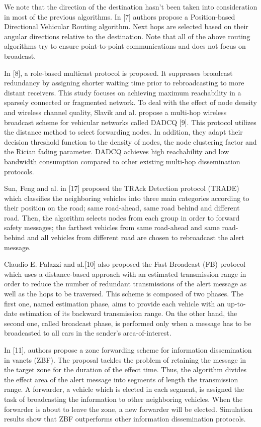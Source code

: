 \documentclass{IEEEtran}
\begin{document}
We note that the direction of the destination hasn't been taken into
consideration in most of the previous algorithms. In [7] authors
propose a Position-based Directional Vehicular Routing algorithm.
Next hops are selected based on their angular directions relative to
the destination. Note that all of the above routing algorithms try
to ensure point-to-point communications and does not focus on
broadcast.

In [8], a role-based multicast protocol is proposed. It suppresses
broadcast redundancy by assigning shorter waiting time prior to
rebroadcasting to more distant receivers. This study focuses on
achieving maximum reachability in a sparsely connected or fragmented
network. To deal with the effect of node density and wireless
channel quality, Slavik and al. propose  a multi-hop wireless
broadcast scheme for vehicular networks called DADCQ [9]. This
protocol utilizes the distance method to select forwarding nodes. In
addition, they adapt their decision threshold function to the
density of nodes, the node clustering factor and the Rician fading
parameter. DADCQ achieves high reachability and low bandwidth
consumption compared to other existing multi-hop dissemination
protocols.

Sun, Feng and al. in [17] proposed the TRAck Detection protocol
(TRADE) which classifies the neighboring vehicles into three main
categories according to their position on the road; same road-ahead,
same road behind and different road. Then, the algorithm selects
nodes from each group in order to forward safety messages; the
farthest vehicles from same road-ahead and same road-behind and all
vehicles from different road are chosen to rebroadcast the alert
message.

Claudio E. Palazzi and al.[10] also proposed the Fast Broadcast (FB)
protocol which uses a distance-based approach with an estimated
transmission range in order to reduce the number of redundant
transmissions of the alert message as well as the hops to be
traversed. This scheme is composed of two phases. The first one,
named estimation phase, aims to provide each vehicle with an
up-to-date estimation of its backward transmission range. On the
other hand, the second one, called broadcast phase, is performed
only when a message has to be broadcasted to all cars in the
sender's area-of-interest.

In [11], authors propose a zone forwarding scheme for information
dissemination in vanets (ZBF). The proposal tackles the problem of
retaining the message in the target zone for the duration of the
effect time. Thus, the algorithm divides the effect area of the
alert message into segments of length the transmission range. A
forwarder, a vehicle which is elected in each segment, is assigned
the task of broadcasting the information to other neighboring
vehicles. When the forwarder is about to leave the zone, a new
forwarder will be elected. Simulation results show that ZBF
outperforms other information dissemination protocols.
\end{document}
